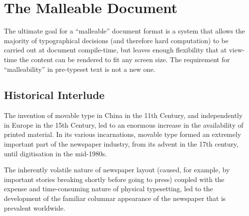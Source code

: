 \cleardoublepage
\chapter{The Malleable Document}\label{ch:malleable}  %




The ultimate goal for a ``malleable'' document format is a system that allows the majority of typographical decisions (and therefore hard computation) to be carried out at document compile-time, but leaves enough flexibility that at view-time the content can be rendered to fit any screen size. The requirement for ``malleability'' in pre-typeset text is not a new one.

\section{Historical Interlude}


The invention of movable type in China in the 11th Century, and independently in Europe in the 15th Century, led to an enormous increase in the availability of printed material. In its various incarnations, movable type formed an extremely important part of the newspaper industry, from its advent in the 17th century, until digitisation in the mid-1980s.

The inherently volatile nature of newspaper layout (caused, for example, by important stories breaking shortly before going to press) coupled with the expense and time-consuming nature of physical typesetting, led to the development of the familiar columnar appearance of the newspaper that is prevalent worldwide.

